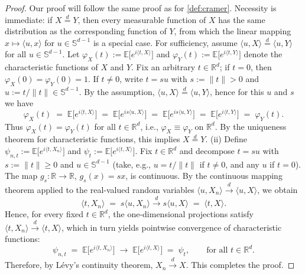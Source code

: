 \begin{proof}
Our proof will follow the same proof as for \cref{def:cramer}. Necessity is immediate: if $X \stackrel{d}{=} Y$, then every measurable function of $X$ has the same distribution as the corresponding function of $Y$, from which the linear mapping $x \mapsto \langle u,x\rangle$ for $u \in \mathbb{S}^{d-1}$ is a special case.
For sufficiency, assume $\langle u,X\rangle \stackrel{d}{=} \langle u,Y\rangle$ for all $u \in \mathbb{S}^{d-1}$. Let $\varphi_X(t) := \mathbb{E}\big[e^{i\langle t,X\rangle}\big]$ and $\varphi_Y(t) := \mathbb{E}\big[e^{i\langle t,Y\rangle}\big]$ denote the characteristic functions of $X$ and $Y$. Fix an arbitrary $t \in \mathbb{R}^d$; if $t=0$, then $\varphi_X(0)=\varphi_Y(0)=1$. If $t \neq 0$, write $t = s u$ with $s := \|t\| > 0$ and $u := t/\|t\| \in \mathbb{S}^{d-1}$. By the assumption, $\langle u,X\rangle \stackrel{d}{=} \langle u,Y\rangle$, hence for this $u$ and $s$ we have
\[
\varphi_X(t) \;=\; \mathbb{E}\big[e^{i\langle t,X\rangle}\big]
\;=\; \mathbb{E}\big[e^{i s \langle u,X\rangle}\big]
\;=\; \mathbb{E}\big[e^{i s \langle u,Y\rangle}\big]
\;=\; \mathbb{E}\big[e^{i\langle t,Y\rangle}\big]
\;=\; \varphi_Y(t).
\]
Thus $\varphi_X(t) = \varphi_Y(t)$ for all $t \in \mathbb{R}^d$, i.e., $\varphi_X \equiv \varphi_Y$ on $\mathbb{R}^d$. By the uniqueness theorem for characteristic functions, this implies $X \stackrel{d}{=} Y$.
(ii) Define $\psi_{n,t} := \mathbb{E}\big[e^{i\langle t,X_n\rangle}\big]$ and $\psi_{t} := \mathbb{E}\big[e^{i\langle t,X\rangle}\big]$. Fix $t \in \mathbb{R}^d$ and decompose $t = s u$ with $s := \|t\| \ge 0$ and $u \in \mathbb{S}^{d-1}$ (take, e.g., $u = t/\|t\|$ if $t \neq 0$, and any $u$ if $t=0$). The map $g_s:\mathbb{R}\to\mathbb{R}$, $g_s(x)=s x$, is continuous. By the continuous mapping theorem applied to the real-valued random variables $\langle u,X_n\rangle \xrightarrow{d} \langle u,X\rangle$, we obtain
\[
\langle t,X_n\rangle \;=\; s \langle u,X_n\rangle \xrightarrow{d} s \langle u,X\rangle \;=\; \langle t,X\rangle.
\]
Hence, for every fixed $t \in \mathbb{R}^d$, the one-dimensional projections satisfy $\langle t,X_n\rangle \xrightarrow{d} \langle t,X\rangle$, which in turn yields pointwise convergence of characteristic functions:
\[
\psi_{n,t} \;=\; \mathbb{E}\big[e^{i\langle t,X_n\rangle}\big] \;\longrightarrow\; \mathbb{E}\big[e^{i\langle t,X\rangle}\big] \;=\; \psi_{t}, \qquad \text{for all } t \in \mathbb{R}^d.
\]
Therefore, by L\'evy's continuity theorem, $X_n \xrightarrow{d} X$.
This completes the proof.
\end{proof}



